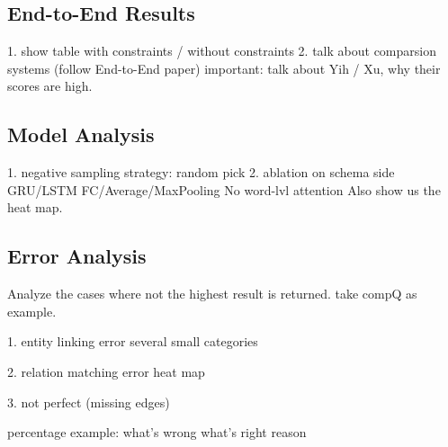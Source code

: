 \subsection{End-to-End Results}

1. show table
with constraints / without constraints
2. talk about comparsion systems (follow End-to-End paper)
important: talk about Yih / Xu, why their scores are high.

\subsection{Model Analysis}

1. negative sampling strategy: random pick
2. ablation on schema side
   GRU/LSTM
   FC/Average/MaxPooling
   No word-lvl attention
Also show us the heat map.


\subsection{Error Analysis}
Analyze the cases where not the highest result is returned.
take compQ as example.

1. entity linking error
several small categories

2. relation matching error
heat map

3. not perfect (missing edges)


percentage
example:
what's wrong
what's right
reason

